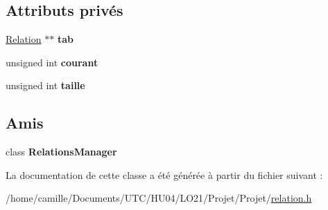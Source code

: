 \subsection*{Attributs privés}
\begin{DoxyCompactItemize}
\item 
\hypertarget{class_relations_manager_1_1_iterator_ad4ead2ce335be1905114ae56ff2ff5f3}{\hyperlink{class_relation}{Relation} $\ast$$\ast$ {\bfseries tab}}\label{class_relations_manager_1_1_iterator_ad4ead2ce335be1905114ae56ff2ff5f3}

\item 
\hypertarget{class_relations_manager_1_1_iterator_a0c72dcf73bc29785ce74863b4aaa1386}{unsigned int {\bfseries courant}}\label{class_relations_manager_1_1_iterator_a0c72dcf73bc29785ce74863b4aaa1386}

\item 
\hypertarget{class_relations_manager_1_1_iterator_aef6b85f9ca5e1abfb072b133d9386b1a}{unsigned int {\bfseries taille}}\label{class_relations_manager_1_1_iterator_aef6b85f9ca5e1abfb072b133d9386b1a}

\end{DoxyCompactItemize}
\subsection*{Amis}
\begin{DoxyCompactItemize}
\item 
\hypertarget{class_relations_manager_1_1_iterator_ac617894445bd4f12c905741b1b4f9f6a}{class {\bfseries Relations\-Manager}}\label{class_relations_manager_1_1_iterator_ac617894445bd4f12c905741b1b4f9f6a}

\end{DoxyCompactItemize}


La documentation de cette classe a été générée à partir du fichier suivant \-:\begin{DoxyCompactItemize}
\item 
/home/camille/\-Documents/\-U\-T\-C/\-H\-U04/\-L\-O21/\-Projet/\-Projet/\hyperlink{relation_8h}{relation.\-h}\end{DoxyCompactItemize}
